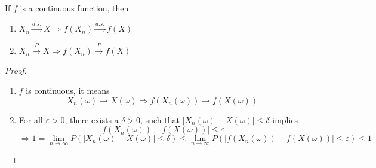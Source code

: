 \begin{reqnoproof}
\begin{theorem}
    If $f$ is a continuous function, then
    \begin{enumerate}[label = \roman*)]
        \item $X_n \overset{a.s.}{\longrightarrow} X \Rightarrow f(X_n) \overset{a.s.}{\longrightarrow}f(X)$
        \item $X_n \overset{P}{\longrightarrow} X \Rightarrow f(X_n) \overset{P}{\longrightarrow} f(X)$
    \end{enumerate}
    \begin{proof}
        \begin{enumerate}[label = \roman*)]
            \item $f$ is continuous, it means
            \[X_n(\omega) \to X(\omega) \Rightarrow f(X_n(\omega)) \to f(X(\omega))\]
            \item For all $\varepsilon > 0$, there exists a $\delta > 0$, such that $\left|X_n(\omega) - X(\omega)\right| \leq \delta$ implies
            \[\left|f(X_n(\omega)) - f(X(\omega))\right| \leq \varepsilon\]
            \[\Rightarrow 1 = \lim_{n\to\infty}P(\left|X_n(\omega) - X(\omega)\right|\leq \delta) \leq \lim_{n\to\infty} P(\left|f(X_n(\omega)) - f(X(\omega))\right| \leq \varepsilon) \leq 1\]
        \end{enumerate}
    \end{proof}
\end{theorem}
\end{reqnoproof}
